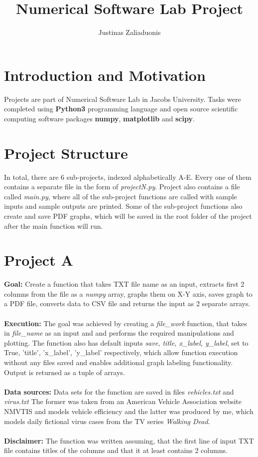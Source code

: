 \documentclass[a4paper,12pt]{article}
\begin{document}
\title{Numerical Software Lab Project}
\author{Justinas Zaliaduonis}
\maketitle


\section{Introduction and Motivation}

Projects are part of Numerical Software Lab in Jacobs University. Tasks were completed using \textbf{Python3} programming language and open source scientific computing software packages \textbf{numpy}, \textbf{matplotlib} and \textbf{scipy}.

\section{Project Structure} 

In total, there are 6 sub-projects, indexed alphabetically A-E. Every one of them contains a separate file in the form of \textit{projectN.py}. Project also contains a file called \textit{main.py}, where all of the sub-project functions are called with sample inputs and sample outputs are printed. Some of the sub-project functions also create and save PDF graphs, which will be saved in the root folder of the project after the main function will run.

\section{Project A}
\textbf{Goal:} Create a function that takes TXT file name as an input, extracts first 2 columns from the file as a \textit{numpy} array, graphs them on X-Y axis, saves graph to a PDF file, converts data to CSV file and returns the input as 2 separate arrays. \\ \\ \textbf{Execution: } The goal was achieved by creating a \textit{file\_work} function, that takes in \textit{file\_name} as an input and and performs the required manipulations and plotting. The function also has default inputs \textit{save, title, x\_label, y\_label}, set to True, 'title', 'x\_label', 'y\_label' respectively, which allow function execution without any files saved and enables additional graph labeling functionality. Output is returned as a tuple of arrays.
\\ \\ \textbf{Data sources:} Data sets for the function are saved in files \textit{vehicles.txt} and \textit{virus.txt} The former was taken from an American Vehicle Association website NMVTIS and models vehicle efficiency and the latter was produced by me, which models daily fictional virus cases from the TV series \textit{Walking Dead}. \\ \\ \textbf{Disclaimer:} The function was written assuming, that the first line of input TXT file contains titles of the columns and
that it at least contains 2 columns.
\end{document}
